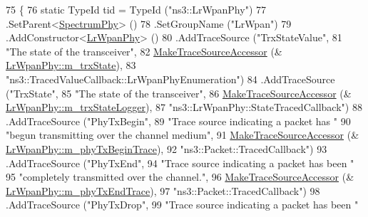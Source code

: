 \begin{DoxyCode}
75 \{
76   \textcolor{keyword}{static} TypeId tid = TypeId (\textcolor{stringliteral}{"ns3::LrWpanPhy"})
77     .SetParent<\hyperlink{classns3_1_1SpectrumPhy_a207bd7373a9fd3b7f8d8e00380a0e7e4}{SpectrumPhy}> ()
78     .SetGroupName (\textcolor{stringliteral}{"LrWpan"})
79     .AddConstructor<\hyperlink{classns3_1_1LrWpanPhy_a93412f30a30d144978857a5205c55b7b}{LrWpanPhy}> ()
80     .AddTraceSource (\textcolor{stringliteral}{"TrxStateValue"},
81                      \textcolor{stringliteral}{"The state of the transceiver"},
82                      \hyperlink{group__tracing_gab21a770b9855af4e8f69f7531ea4a6b0}{MakeTraceSourceAccessor} (&
      \hyperlink{classns3_1_1LrWpanPhy_a316704a4eb96e04f4b960ba3577fe0ce}{LrWpanPhy::m\_trxState}),
83                      \textcolor{stringliteral}{"ns3::TracedValueCallback::LrWpanPhyEnumeration"})
84     .AddTraceSource (\textcolor{stringliteral}{"TrxState"},
85                      \textcolor{stringliteral}{"The state of the transceiver"},
86                      \hyperlink{group__tracing_gab21a770b9855af4e8f69f7531ea4a6b0}{MakeTraceSourceAccessor} (&
      \hyperlink{classns3_1_1LrWpanPhy_ae48d12b3f7dd9ebc93ae1a7e0d570f52}{LrWpanPhy::m\_trxStateLogger}),
87                      \textcolor{stringliteral}{"ns3::LrWpanPhy::StateTracedCallback"})
88     .AddTraceSource (\textcolor{stringliteral}{"PhyTxBegin"},
89                      \textcolor{stringliteral}{"Trace source indicating a packet has "}
90                      \textcolor{stringliteral}{"begun transmitting over the channel medium"},
91                      \hyperlink{group__tracing_gab21a770b9855af4e8f69f7531ea4a6b0}{MakeTraceSourceAccessor} (&
      \hyperlink{classns3_1_1LrWpanPhy_a72273155da1a3b5340389633f5486860}{LrWpanPhy::m\_phyTxBeginTrace}),
92                      \textcolor{stringliteral}{"ns3::Packet::TracedCallback"})
93     .AddTraceSource (\textcolor{stringliteral}{"PhyTxEnd"},
94                      \textcolor{stringliteral}{"Trace source indicating a packet has been "}
95                      \textcolor{stringliteral}{"completely transmitted over the channel."},
96                      \hyperlink{group__tracing_gab21a770b9855af4e8f69f7531ea4a6b0}{MakeTraceSourceAccessor} (&
      \hyperlink{classns3_1_1LrWpanPhy_a34c1c896916f90010cd7f4ba5eaa5385}{LrWpanPhy::m\_phyTxEndTrace}),
97                      \textcolor{stringliteral}{"ns3::Packet::TracedCallback"})
98     .AddTraceSource (\textcolor{stringliteral}{"PhyTxDrop"},
99                      \textcolor{stringliteral}{"Trace source indicating a packet has been "}

\end{DoxyCode}
